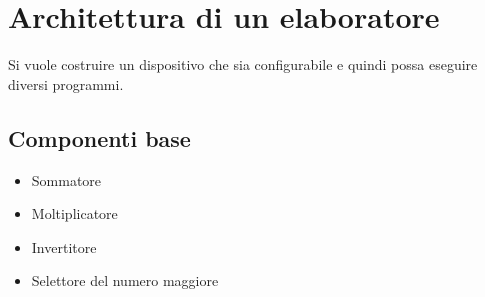 \documentclass[a4paper]{article}
\theoremstyle{break}
\theoremstyle{break}
\theoremstyle{break}
\theoremstyle{break}
\begin{document}
\section{Architettura di un elaboratore}
Si vuole costruire un dispositivo che sia configurabile e quindi possa eseguire diversi programmi.
\subsection{Componenti base}
\begin{itemize}
  \item Sommatore
  \item Moltiplicatore
  \item Invertitore
  \item Selettore del numero maggiore
\end{itemize}
\label{D1}
\end{document}
